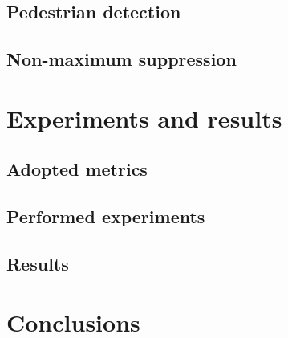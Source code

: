 \documentclass[journal,twocolumn]{IEEEtran}
\begin{document}
\subsection{Pedestrian detection}

\subsection{Non-maximum suppression}

\section{Experiments and results}
\label{sec:exp}

\subsection{Adopted metrics}

\subsection{Performed experiments}

\subsection{Results}

\section{Conclusions}
\label{sec:conc}

\printbibliography
\end{document}
